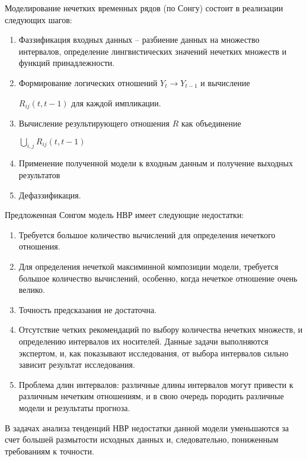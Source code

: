 Моделирование нечетких временных рядов (по Сонгу) состоит в реализации следующих шагов:
\begin{enumerate}
\item Фаззификация входных данных – разбиение данных на множество интервалов, определение лингвистических значений нечетких множеств и функций принадлежности.
\item Формирование логических отношений $Y_t \to Y_{t-1}$ и вычисление

 $R_{ij}(t,t-1)$ для каждой импликации.
\item Вычисление результирующего отношения $R$ как объединение 

$\bigcup_{i,j} R_{ij}(t,t-1) $
\item Применение полученной модели к входным данным и получение выходных результатов
\item Дефаззификация.
\end{enumerate}

Предложенная Сонгом модель НВР имеет следующие недостатки:
\begin{enumerate}
\item Требуется большое количество вычислений для определения нечеткого отношения.
\item Для определения нечеткой максиминной композиции модели, требуется большое количество вычислений, особенно, когда нечеткое отношение очень велико.
\item Точность предсказания не достаточна.
\item Отсутствие четких рекомендаций по выбору количества нечетких множеств, и определению интервалов их носителей. Данные задачи выполняются экспертом, и, как показывают исследования, от выбора интервалов сильно зависит результат исследования.
\item Проблема длин интервалов: различные длины интервалов могут привести к различным нечетким отношениям, и в свою очередь породить различные модели и результаты прогноза. 
\end{enumerate}

В задачах анализа тенденций НВР недостатки данной модели уменьшаются за счет большей размытости исходных данных и, следовательно, пониженным требованиям к точности. 
